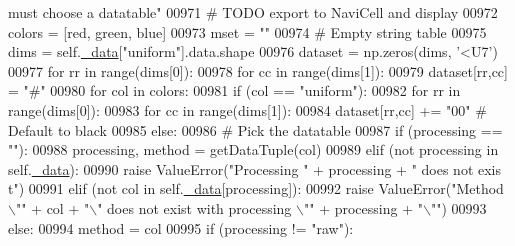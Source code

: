 \begin{DoxyCode}
{      must choose a datatable"}
00971         \textcolor{comment}{# TODO export to NaviCell and display}
00972         colors = [red, green, blue]
00973         mset = \textcolor{stringliteral}{""}
00974         \textcolor{comment}{# Empty string table}
00975         dims = self.\hyperlink{classnavicom_1_1navicom_1_1NaviCom_a407b2b5c30a5652ee85c4be54b3e6679}{_data}[\textcolor{stringliteral}{"uniform"}].data.shape
00976         dataset = np.zeros(dims, \textcolor{stringliteral}{'<U7'})
00977         \textcolor{keywordflow}{for} rr \textcolor{keywordflow}{in} range(dims[0]):
00978             \textcolor{keywordflow}{for} cc \textcolor{keywordflow}{in} range(dims[1]):
00979                 dataset[rr,cc] = \textcolor{stringliteral}{"#"}
00980         \textcolor{keywordflow}{for} col \textcolor{keywordflow}{in} colors:
00981             \textcolor{keywordflow}{if} (col == \textcolor{stringliteral}{"uniform"}):
00982                 \textcolor{keywordflow}{for} rr \textcolor{keywordflow}{in} range(dims[0]):
00983                     \textcolor{keywordflow}{for} cc \textcolor{keywordflow}{in} range(dims[1]):
00984                         dataset[rr,cc] += \textcolor{stringliteral}{"00"} \textcolor{comment}{# Default to black}
00985             \textcolor{keywordflow}{else}:
00986                 \textcolor{comment}{# Pick the datatable}
00987                 \textcolor{keywordflow}{if} (processing == \textcolor{stringliteral}{""}):
00988                     processing, method = getDataTuple(col)
00989                 \textcolor{keywordflow}{elif} (\textcolor{keywordflow}{not} processing \textcolor{keywordflow}{in} self.\hyperlink{classnavicom_1_1navicom_1_1NaviCom_a407b2b5c30a5652ee85c4be54b3e6679}{_data}):
00990                     \textcolor{keywordflow}{raise} ValueError(\textcolor{stringliteral}{"Processing "} + processing + \textcolor{stringliteral}{" does not exis
      t"})
00991                 \textcolor{keywordflow}{elif} (\textcolor{keywordflow}{not} col \textcolor{keywordflow}{in} self.\hyperlink{classnavicom_1_1navicom_1_1NaviCom_a407b2b5c30a5652ee85c4be54b3e6679}{_data}[processing]):
00992                     \textcolor{keywordflow}{raise} ValueError(\textcolor{stringliteral}{"Method \(\backslash\)""} + col + \textcolor{stringliteral}{"\(\backslash\)" does not exist with 
      processing \(\backslash\)""} + processing + \textcolor{stringliteral}{"\(\backslash\)""})
00993                 \textcolor{keywordflow}{else}:
00994                     method = col
00995                 \textcolor{keywordflow}{if} (processing != \textcolor{stringliteral}{"raw"}):

\end{DoxyCode}
